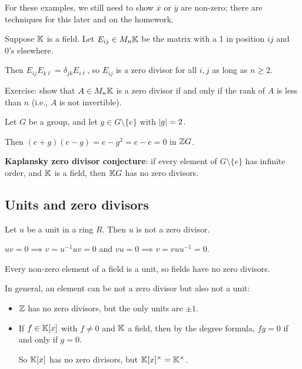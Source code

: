 \documentclass[12pt,letterpaper]{report}
\begin{document}
For these examples, we still need to show $\overline{x}$ or $\overline{y}$ are non-zero; there are
techniques for this later and on the homework.

\begin{ex}
  Suppose $\mathbb{K}$ is a field.
  Let $E_{ij} \in M_n\mathbb{K}$ be the matrix with a 1 in position $ij$ and 0's elsewhere.

  Then $E_{ij}E_{k\ell} = \delta_{jk}E_{i\ell}$, so $E_{ij}$ is a zero divisor for all $i, j$
  as long as $n \geq 2$.

  Exercise: show that $A \in M_n\mathbb{K}$ is a zero divisor if and only if the rank of $A$ is
  less than $n$ (i.e., $A$ is not invertible).
\end{ex}

\begin{ex}
  Let $G$ be a group, and let $g \in G \setminus \{e\}$ with $\lvert g\rvert = 2$.

  Then $(e + g)(e - g) = e - g^2 = e - e = 0$ in $\mathbb{Z} G$.

  \textbf{Kaplansky zero divisor conjecture}: if every element of $G \setminus \{e\}$ has infinite
  order, and $\mathbb{K}$ is a field, then $\mathbb{K} G$ has no zero divisors.
\end{ex}

\pagebreak
\subsection{Units and zero divisors}

\begin{lem}{}{}
  Let $u$ be a unit in a ring $R$.
  Then $u$ is not a zero divisor.
\end{lem}

\begin{thmproof}
  $uv = 0 \implies v = u^{-1}uv = 0$ and $vu = 0 \implies v = vuu^{-1} = 0$.
\end{thmproof}

Every non-zero element of a field is a unit, so fields have no zero divisors.

In general, an element can be not a zero divisor but also not a unit:
\begin{itemize}
  \item $\mathbb{Z}$ has no zero divisors, but the only units are $\pm 1$.
  \item If $f \in \mathbb{K}[x]$ with $f \neq 0$ and $\mathbb{K}$ a field, then by the degree
    formula, $fg = 0$ if and only if $g = 0$.

    So $\mathbb{K}[x]$ has no zero divisors, but $\mathbb{K}[x]^\times = \mathbb{K}^\times$.
\end{itemize}
\end{document}

